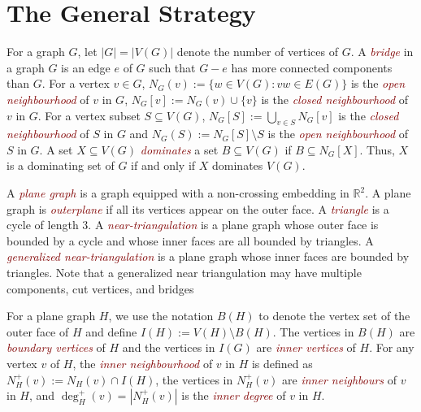 \documentclass[12pt]{article}
\newcommand{\defin}[1]{\emph{\textcolor{Maroon}{#1}}}
\theoremstyle{definition}
\newcommand{\pat}[1]{[\textcolor{red}{PM: #1}]}
\begin{document}
%


\section{The General Strategy}
\label{strategy}

For a graph $G$, let $|G|=|V(G)|$ denote the number of vertices of $G$.  A \defin{bridge} in a graph $G$ is an edge $e$ of $G$ such that $G-e$ has more connected components than $G$.  For a vertex $v\in G$, $N_G(v):=\{w\in V(G):vw\in E(G)\}$ is the \defin{open neighbourhood} of $v$ in $G$,  $N_G[v]:=N_G(v)\cup\{v\}$ is the \defin{closed neighbourhood} of $v$ in $G$.  For a vertex subset $S\subseteq V(G)$, $N_G[S]:=\bigcup_{v\in S} N_{G}[v]$ is the \defin{closed neighbourhood} of $S$ in $G$ and $N_G(S):=N_G[S]\setminus S$ is the \defin{open neighbourhood} of $S$ in $G$.  A set $X\subseteq V(G)$ \defin{dominates} a set $B\subseteq V(G)$ if $B\subseteq N_G[X]$.  Thus, $X$ is a dominating set of $G$ if and only if $X$ dominates $V(G)$.

A \defin{plane graph} is a graph equipped with a non-crossing embedding in $\mathbb{R}^2$.  A plane graph is \defin{outerplane} if all its vertices appear on the outer face.  A \defin{triangle} is a cycle of length $3$. A \defin{near-triangulation} is a plane graph whose outer face is bounded by a cycle and whose inner faces are all bounded by triangles.  A \defin{generalized near-triangulation} is a plane graph whose inner faces are bounded by triangles. Note that a generalized near triangulation may have multiple components, cut vertices, and bridges


For a plane graph $H$, we use the notation $B(H)$ to denote the vertex set of the outer face of $H$ and define $I(H):=V(H)\setminus B(H)$.  The vertices in $B(H)$ are \defin{boundary vertices} of $H$ and the vertices in $I(G)$ are \defin{inner vertices} of $H$. For any vertex $v$ of $H$, the \defin{inner neighbourhood} of $v$ in $H$ is defined as $N_H^+(v):=N_H(v)\cap I(H)$, the vertices in $N^+_H(v)$ are \defin{inner neighbours} of $v$ in $H$, and $\deg^+_H(v)=|N^+_H(v)|$ is the \defin{inner degree} of $v$ in $H$.
\end{document}
